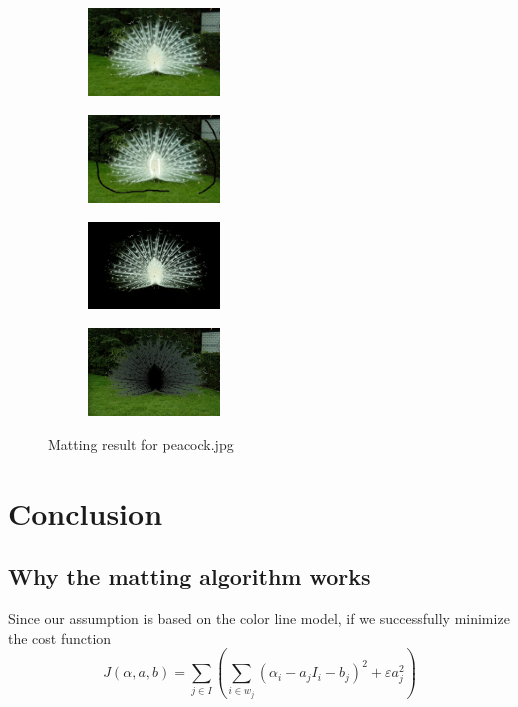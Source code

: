 \documentclass[11pt,letterpaper]{article}
\begin{document}
\begin{figure}[h!]
  \centering
  \begin{subfigure}{0.24\textwidth}
    \centering
    \includegraphics[width=3.5cm]{./result/peacock/peacock.jpg}
    \caption{}
  \end{subfigure}
  \begin{subfigure}{0.24\textwidth}
    \centering
    \includegraphics[width=3.5cm]{./result/peacock/peacock_m.jpg}
    \caption{}
  \end{subfigure}
  \begin{subfigure}{0.24\textwidth}
    \centering
    \includegraphics[width=3.5cm]{./result/peacock/peacock_foreground.png}
    \caption{}
  \end{subfigure}
  \begin{subfigure}{0.24\textwidth}
    \centering
    \includegraphics[width=3.5cm]{./result/peacock/peacock_background.png}
    \caption{}
  \end{subfigure}    
  \caption {Matting result for peacock.jpg}
\end{figure}

\newpage

\section{Conclusion}
\subsection{Why the matting algorithm works}
Since our assumption is based on the color line model, if we successfully minimize the cost function 
$$J(\alpha, a, b) = \sum_{j \in I}(\sum_{i \in w_j}(\alpha_i - a_jI_i-b_j)^2+\varepsilon a_j^2)$$
\end{document}
